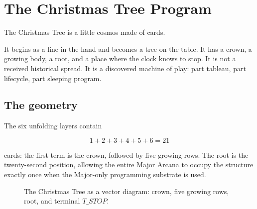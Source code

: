 \chapter{The Christmas Tree Program}

The Christmas Tree is a little cosmos made of cards.

It begins as a line in the hand and becomes a tree on the table. It has a
crown, a growing body, a root, and a place where the clock knows to stop. It is
not a received historical spread. It is a discovered machine of play: part
tableau, part lifecycle, part sleeping program.

\section{The geometry}

The six unfolding layers contain

\[
1+2+3+4+5+6=21
\]

cards: the first term is the crown, followed by five growing rows. The root is
the twenty-second position, allowing the entire Major Arcana to occupy the
structure exactly once when the Major-only programming substrate is used.

\begin{figure}[ht]
  \centering
  \caption{The Christmas Tree as a vector diagram: crown, five growing rows,
  root, and terminal $T\_STOP$.}
\end{figure}

